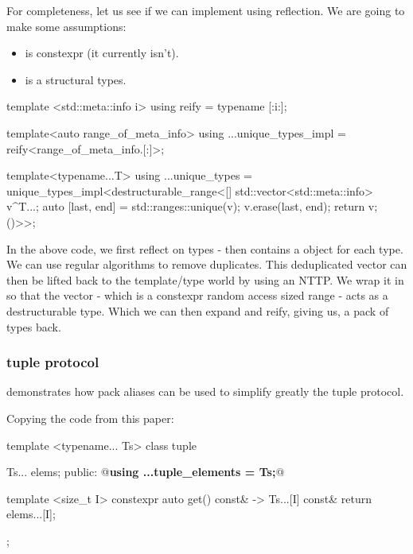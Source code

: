 \documentclass{wg21}
\begin{document}
For completeness, let us see if we can implement  using reflection.
We are going to make some assumptions:

\begin{itemize}
    \item {} is constexpr (it currently isn't).
    \item {} is a structural types.
\end{itemize}

\begin{colorblock}
template <std::meta::info i>
using reify =  typename [:i:];

template<auto range_of_meta_info>
using ...unique_types_impl = reify<range_of_meta_info.[:]>;

template<typename...T>
using ...unique_types =
    unique_types_impl<destructurable_range<[] {
                std::vector<std::meta::info> v{^T...};
                auto [last, end] = std::ranges::unique(v);
                v.erase(last, end);
                return v;
            }()>{}>;
\end{colorblock}

In the above code, we first reflect on types -  then contains a  object for each type.
We can use regular algorithms to remove duplicates.
This deduplicated vector can then be lifted back to the template/type world by using an NTTP. We wrap it in 
so that the vector - which is a constexpr random access sized range - acts as a destructurable type.
Which we can then expand and reify, giving us, a pack of types back.


\subsubsection{tuple protocol}
\label{sec:tuple_protocol}

 demonstrates how pack aliases can be used to simplify greatly the tuple protocol.

Copying the code from this paper:

\begin{colorblock}
template <typename... Ts>
class tuple {
    Ts... elems;
public:
    @\textbf{using ...tuple_elements = Ts;}@

    template <size_t I>
    constexpr auto get() const& -> Ts...[I] const& {
        return elems...[I];
    }
};
\end{colorblock}
\end{document}
